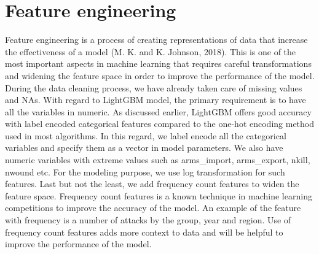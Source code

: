 \documentclass[11pt,oneside,a4paper]{reedthesis}
\begin{document}
\section{Feature engineering}\label{feature-engineering}

Feature engineering is a process of creating representations of data
that increase the effectiveness of a model (M. K. and K. Johnson, 2018).
This is one of the most important aspects in machine learning that
requires careful transformations and widening the feature space in order
to improve the performance of the model. During the data cleaning
process, we have already taken care of missing values and NAs. With
regard to LightGBM model, the primary requirement is to have all the
variables in numeric. As discussed earlier, LightGBM offers good
accuracy with label encoded categorical features compared to the one-hot
encoding method used in most algorithms. In this regard, we label encode
all the categorical variables and specify them as a vector in model
parameters. We also have numeric variables with extreme values such as
arms\_import, arms\_export, nkill, nwound etc. For the modeling purpose,
we use log transformation for such features. Last but not the least, we
add frequency count features to widen the feature space. Frequency count
features is a known technique in machine learning competitions to
improve the accuracy of the model. An example of the feature with
frequency is a number of attacks by the group, year and region. Use of
frequency count features adds more context to data and will be helpful
to improve the performance of the model.
\end{document}

